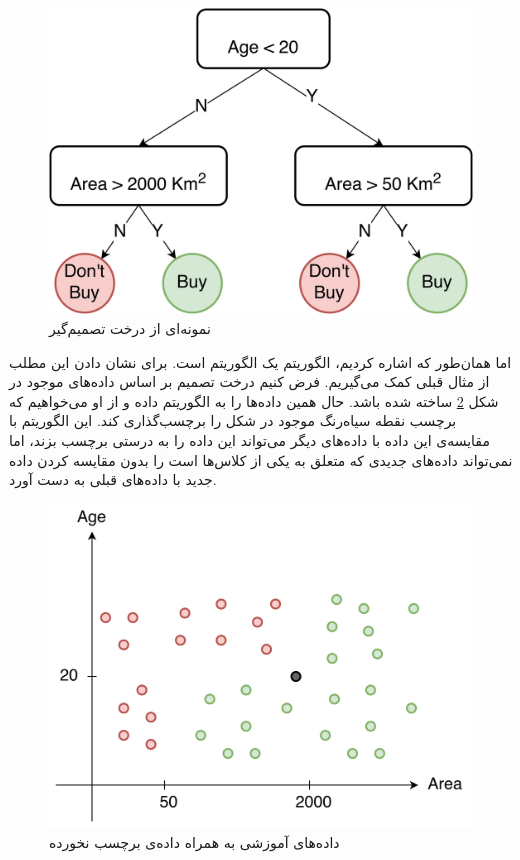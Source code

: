 \documentclass{article}
\begin{document}
\begin{figure}[h]
    \centering
    \includegraphics[scale=0.4]{images/q2/decision-tree.png}
    \caption{نمونه‌ای از درخت تصمیم‌گیر}
    \label{decision-tree-example}
\end{figure}

اما همان‌طور که اشاره کردیم، الگوریتم  یک الگوریتم  است. برای نشان دادن این مطلب
از مثال قبلی کمک می‌گیریم. فرض کنیم درخت تصمیم بر اساس داده‌های موجود در شکل \ref{sample} ساخته شده باشد.
حال همین داده‌ها را به الگوریتم  داده و از او می‌خواهیم که برچسب نقطه سیاه‌رنگ موجود در شکل را برچسب‌گذاری
کند. این الگوریتم با مقایسه‌ی این داده با داده‌های دیگر می‌تواند این داده را به درستی برچسب بزند، اما نمی‌تواند
داده‌های جدیدی که متعلق به یکی از کلاس‌ها است را بدون مقایسه کردن داده جدید با داده‌های قبلی به دست آورد.

\begin{figure}[h]
    \centering
    \includegraphics[scale=0.4]{images/q2/samples.png}
    \caption{داده‌های آموزشی به همراه داده‌ی برچسب نخورده}
    \label{sample}
\end{figure}
\end{document}
